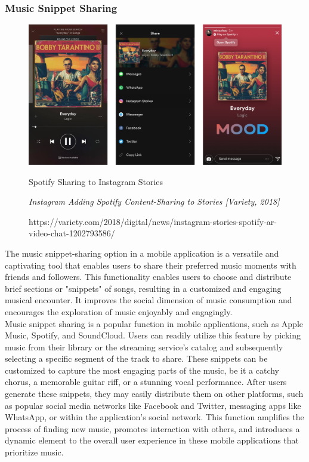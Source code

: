 \subsubsection{Music Snippet Sharing}
\begin{figure}[h]
    \centering
    \includegraphics[width=1.0\linewidth]{mainmatter/images/musicshare.jpg}
    \caption{Spotify Sharing to Instagram Stories}
    \caption*{\textit{Instagram Adding Spotify Content-Sharing to Stories [Variety, 2018]}}
    \caption*{https://variety.com/2018/digital/news/instagram-stories-spotify-ar-video-chat-1202793586/}
    \label{fig:myfig11}
\end{figure}
The music snippet-sharing option in a mobile application is a versatile and captivating tool that enables users to share their preferred music moments with friends and followers. This functionality enables users to choose and distribute brief sections or "snippets" of songs, resulting in a customized and engaging musical encounter. It improves the social dimension of music consumption and encourages the exploration of music enjoyably and engagingly. \\

Music snippet sharing is a popular function in mobile applications, such as Apple Music, Spotify, and SoundCloud. Users can readily utilize this feature by picking music from their library or the streaming service's catalog and subsequently selecting a specific segment of the track to share. These snippets can be customized to capture the most engaging parts of the music, be it a catchy chorus, a memorable guitar riff, or a stunning vocal performance. After users generate these snippets, they may easily distribute them on other platforms, such as popular social media networks like Facebook and Twitter, messaging apps like WhatsApp, or within the application's social network. This function amplifies the process of finding new music, promotes interaction with others, and introduces a dynamic element to the overall user experience in these mobile applications that prioritize music. \\

